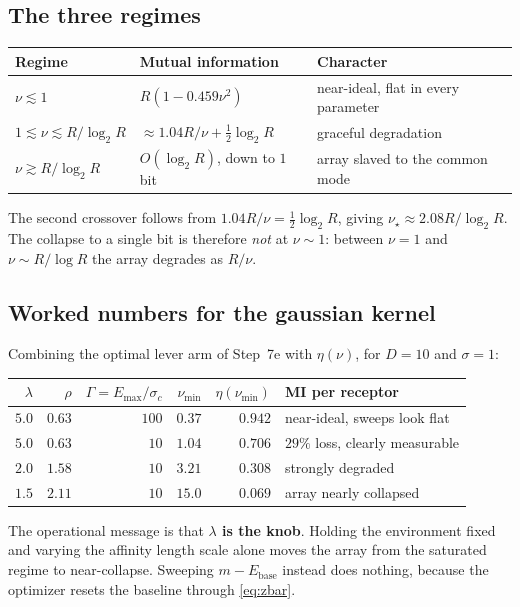 \documentclass[11pt,a4paper]{article}
\newcommand{\Ebase}{E_{\mathrm{base}}}
\newcommand{\Emax}{E_{\mathrm{max}}}
\begin{document}
\subsection{The three regimes}

\begin{center}
\begin{tabular}{lll}
\toprule
Regime & Mutual information & Character \\
\midrule
$\nu\lesssim1$ & $R(1-0.459\nu^2)$ & near-ideal, flat in every parameter \\
$1\lesssim\nu\lesssim R/\log_2 R$ & $\approx1.04R/\nu+\tfrac12\log_2 R$ & graceful degradation \\
$\nu\gtrsim R/\log_2 R$ & $O(\log_2 R)$, down to $1$ bit & array slaved to the common mode \\
\bottomrule
\end{tabular}
\end{center}
The second crossover follows from $1.04R/\nu=\tfrac12\log_2R$, giving
$\nu_\star\approx2.08R/\log_2R$. The collapse to a single bit is therefore \emph{not} at
$\nu\sim1$: between $\nu=1$ and $\nu\sim R/\log R$ the array degrades as $R/\nu$.

\subsection{Worked numbers for the gaussian kernel}

Combining the optimal lever arm of Step~7e with $\eta(\nu)$, for $D=10$ and $\sigma=1$:
\begin{center}
\begin{tabular}{rrrrrl}
\toprule
$\lambda$ & $\rho$ & $\Gamma=\Emax/\sigma_c$ & $\nu_{\min}$ & $\eta(\nu_{\min})$ & MI per receptor \\
\midrule
$5.0$ & $0.63$ & $100$ & $0.37$ & $0.942$ & near-ideal, sweeps look flat \\
$5.0$ & $0.63$ & $10$  & $1.04$ & $0.706$ & $29\%$ loss, clearly measurable \\
$2.0$ & $1.58$ & $10$  & $3.21$ & $0.308$ & strongly degraded \\
$1.5$ & $2.11$ & $10$  & $15.0$ & $0.069$ & array nearly collapsed \\
\bottomrule
\end{tabular}
\end{center}
The operational message is that \textbf{$\lambda$ is the knob}. Holding the environment
fixed and varying the affinity length scale alone moves the array from the saturated
regime to near-collapse. Sweeping $m-\Ebase$ instead does nothing, because the optimizer
resets the baseline through \eqref{eq:zbar}.
\end{document}
